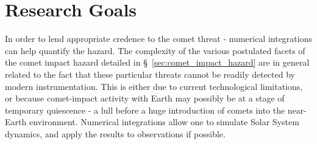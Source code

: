 






\vspace{-.5ex}
\section{Research Goals}
\vspace{-.5ex}

In order to lend appropriate credence to the comet threat - numerical integrations can help quantify the hazard. The complexity of the various postulated facets of the comet impact hazard detailed in \S~\ref{sec:comet_impact_hazard} are in general related to the fact that these particular threats cannot be readily detected by modern instrumentation. This is either due to current technological limitations, or because comet-impact activity with Earth may possibly be at a stage of temporary quiescence - a lull before a huge introduction of comets into the near-Earth environment. Numerical integrations allow one to simulate Solar System dynamics, and apply the results to observations if possible.%

